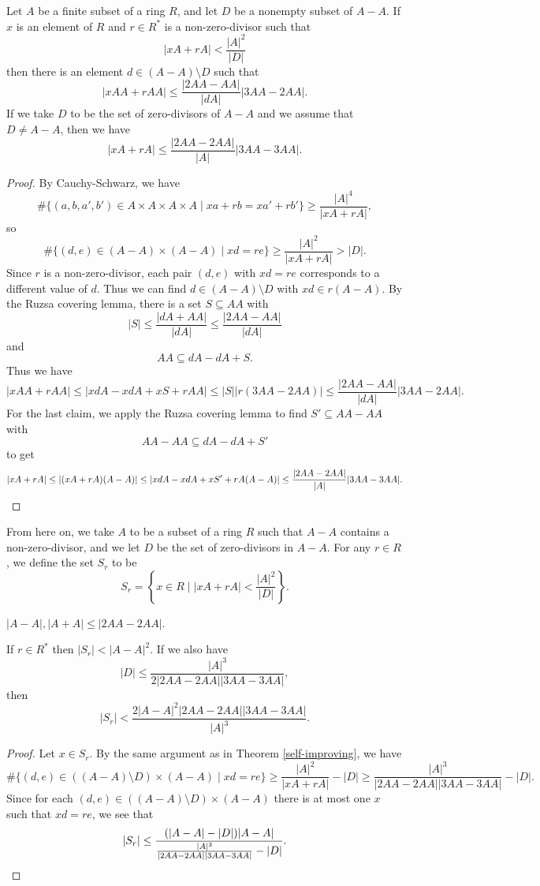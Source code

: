 \begin{thm}\label{self-improving} Let $A$ be a finite subset of a ring $R$, and let $D$ be a nonempty subset of $A-A$. If $x$ is an element of $R$ and $r\in R^*$ is a non-zero-divisor such that
\[
|xA+rA| < \frac{|A|^2}{|D|}
\]
then there is an element $d \in (A-A)\setminus D$ such that
\[
|xAA+rAA| \le \frac{|2AA-AA|}{|dA|}|3AA-2AA|.
\]
If we take $D$ to be the set of zero-divisors of $A-A$ and we assume that $D \ne A-A$, then we have
\[
|xA+rA| \le \frac{|2AA-2AA|}{|A|}|3AA-3AA|.
\]
\end{thm}
\begin{proof} By Cauchy-Schwarz, we have
\[
\#\{(a,b,a',b')\in A\times A\times A\times A \mid xa+rb = xa'+rb'\} \ge \frac{|A|^4}{|xA+rA|},
\]
so
\[
\#\{(d,e)\in (A-A)\times (A-A) \mid xd = re\} \ge \frac{|A|^2}{|xA+rA|} > |D|.
\]
Since $r$ is a non-zero-divisor, each pair $(d,e)$ with $xd = re$ corresponds to a different value of $d$. Thus we can find $d \in (A-A)\setminus D$ with $xd\in r(A-A)$. By the Ruzsa covering lemma, there is a set $S \subseteq AA$ with
\[
|S| \le \frac{|dA+AA|}{|dA|} \le \frac{|2AA-AA|}{|dA|}
\]
and
\[
AA \subseteq dA-dA+S.
\]
Thus we have
\[
|xAA+rAA| \le |xdA-xdA+xS+rAA| \le |S||r(3AA-2AA)| \le \frac{|2AA-AA|}{|dA|}|3AA-2AA|.
\]
For the last claim, we apply the Ruzsa covering lemma to find $S' \subseteq AA-AA$ with
\[
AA-AA \subseteq dA-dA+S'
\]
to get
\[
|xA+rA| \le |(xA+rA)(A-A)| \le |xdA-xdA+xS'+rA(A-A)| \le \frac{|2AA-2AA|}{|A|}|3AA-3AA|.\qedhere
\]
\end{proof}

From here on, we take $A$ to be a subset of a ring $R$ such that $A-A$ contains a non-zero-divisor, and we let $D$ be the set of zero-divisors in $A-A$. For any $r \in R$, we define the set $S_r$ to be
\[
S_r = \left\{x \in R \mid |xA+rA| < \frac{|A|^2}{|D|}\right\}.
\]

\begin{prop} $|A-A|, |A+A| \le |2AA-2AA|$.
\end{prop}

\begin{prop} If $r \in R^*$ then $|S_r| < |A-A|^2$. If we also have
\[
|D| \le \frac{|A|^3}{2|2AA-2AA||3AA-3AA|},
\]
then
\[
|S_r| < \frac{2|A-A|^2|2AA-2AA||3AA-3AA|}{|A|^3}.
\]
\end{prop}
\begin{proof} Let $x \in S_r$. By the same argument as in Theorem \ref{self-improving}, we have
\[
\#\{(d,e)\in ((A-A)\setminus D)\times (A-A) \mid xd = re\} \ge \frac{|A|^2}{|xA+rA|} - |D| \ge \frac{|A|^3}{|2AA-2AA||3AA-3AA|} - |D|.
\]
Since for each $(d,e) \in ((A-A)\setminus D)\times (A-A)$ there is at most one $x$ such that $xd = re$, we see that
\[
|S_r| \le \frac{(|A-A|-|D|)|A-A|}{\frac{|A|^3}{|2AA-2AA||3AA-3AA|} - |D|}.\qedhere
\]
\end{proof}

